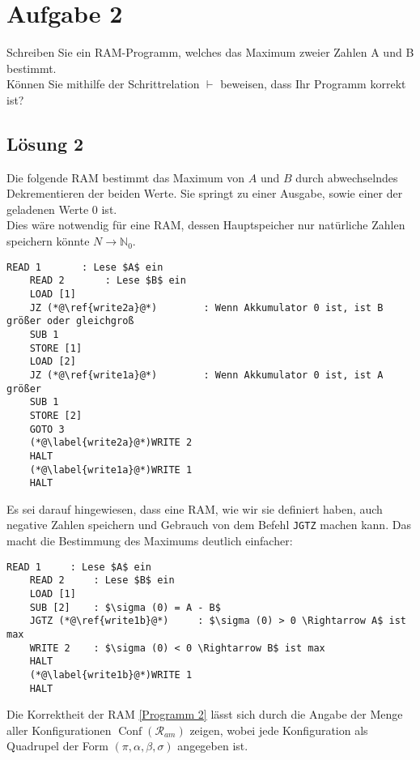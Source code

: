 \documentclass[main.tex]{subfiles}
\begin{document}
\section{Aufgabe 2}
Schreiben Sie ein RAM-Programm, welches das Maximum zweier Zahlen A und B bestimmt.\\
Können Sie mithilfe der Schrittrelation $\vdash$ beweisen, dass Ihr Programm korrekt ist?

\subsection{Lösung 2}

Die folgende RAM bestimmt das Maximum von $A$ und $B$ durch abwechselndes Dekrementieren
der beiden Werte. Sie springt zu einer Ausgabe, sowie einer der geladenen Werte $0$ ist.\\
Dies wäre notwendig für eine RAM, dessen Hauptspeicher nur natürliche Zahlen speichern könnte $N \to \mathbb{N}_0$.

\begin{lstlisting}[language=RAM, caption={Maximum von $A$ und $B$ wenn $N \to \mathbb{N}_0$}, label={Programm 1}]
    READ 1		 : Lese $A$ ein
    READ 2		 : Lese $B$ ein
    LOAD [1]
    JZ (*@\ref{write2a}@*)        : Wenn Akkumulator 0 ist, ist B größer oder gleichgroß
    SUB 1
    STORE [1]
    LOAD [2]
    JZ (*@\ref{write1a}@*)        : Wenn Akkumulator 0 ist, ist A größer
    SUB 1
    STORE [2]
    GOTO 3
    (*@\label{write2a}@*)WRITE 2
    HALT
    (*@\label{write1a}@*)WRITE 1
    HALT
\end{lstlisting}

Es sei darauf hingewiesen, dass eine RAM, wie wir sie definiert haben, auch negative Zahlen speichern
und Gebrauch von dem Befehl \lstinline[language=RAM]{JGTZ} machen kann.
Das macht die Bestimmung des Maximums deutlich einfacher:

\begin{lstlisting}[language=RAM, caption={Maximum von A und B bei $N \to \mathbb{Z}$}, label={Programm 2}]
    READ 1     : Lese $A$ ein
    READ 2     : Lese $B$ ein
    LOAD [1]
    SUB [2]    : $\sigma (0) = A - B$
    JGTZ (*@\ref{write1b}@*)     : $\sigma (0) > 0 \Rightarrow A$ ist max
    WRITE 2    : $\sigma (0) < 0 \Rightarrow B$ ist max
    HALT
    (*@\label{write1b}@*)WRITE 1
    HALT
\end{lstlisting}

Die Korrektheit der RAM \ref{Programm 2} lässt sich durch die Angabe der Menge aller Konfigurationen $\operatorname{Conf}(\mathcal{R}_{am})$ zeigen,
wobei jede Konfiguration als Quadrupel der Form $(\pi , \alpha , \beta , \sigma)$ angegeben ist.
\end{document}
